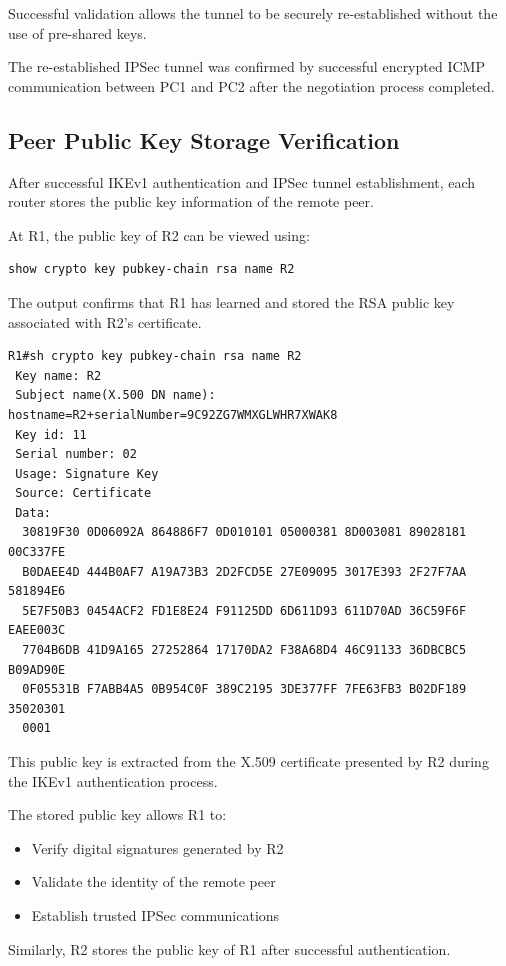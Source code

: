 \documentclass[12pt]{article}
\begin{document}
Successful validation allows the tunnel to be securely re-established without the use of pre-shared keys.

The re-established IPSec tunnel was confirmed by successful encrypted ICMP communication between PC1 and PC2 after the negotiation process completed.

\subsection{Peer Public Key Storage Verification}

After successful IKEv1 authentication and IPSec tunnel establishment, each router stores the public key information of the remote peer.

At R1, the public key of R2 can be viewed using:

\begin{verbatim}
show crypto key pubkey-chain rsa name R2
\end{verbatim}

The output confirms that R1 has learned and stored the RSA public key associated with R2's certificate.

\begin{verbatim}
R1#sh crypto key pubkey-chain rsa name R2
 Key name: R2 
 Subject name(X.500 DN name): hostname=R2+serialNumber=9C92ZG7WMXGLWHR7XWAK8
 Key id: 11 
 Serial number: 02
 Usage: Signature Key
 Source: Certificate
 Data:
  30819F30 0D06092A 864886F7 0D010101 05000381 8D003081 89028181 00C337FE 
  B0DAEE4D 444B0AF7 A19A73B3 2D2FCD5E 27E09095 3017E393 2F27F7AA 581894E6 
  5E7F50B3 0454ACF2 FD1E8E24 F91125DD 6D611D93 611D70AD 36C59F6F EAEE003C 
  7704B6DB 41D9A165 27252864 17170DA2 F38A68D4 46C91133 36DBCBC5 B09AD90E 
  0F05531B F7ABB4A5 0B954C0F 389C2195 3DE377FF 7FE63FB3 B02DF189 35020301 
  0001
\end{verbatim}

This public key is extracted from the X.509 certificate presented by R2 during the IKEv1 authentication process.

The stored public key allows R1 to:
\begin{itemize}
\item Verify digital signatures generated by R2
\item Validate the identity of the remote peer
\item Establish trusted IPSec communications
\end{itemize}

Similarly, R2 stores the public key of R1 after successful authentication.
\end{document}
